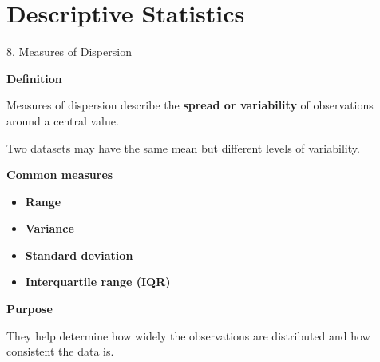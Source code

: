 
\section{Descriptive Statistics}


\begin{frame}{8. Measures of Dispersion}

\textbf{Definition}

Measures of dispersion describe the \textbf{spread or variability}
of observations around a central value.

\vspace{0.4cm}

Two datasets may have the same mean but different levels of
variability.

\vspace{0.4cm}

\textbf{Common measures}

\begin{itemize}
    \item \textbf{Range}
    \item \textbf{Variance}
    \item \textbf{Standard deviation}
    \item \textbf{Interquartile range (IQR)}
\end{itemize}

\vspace{0.3cm}

\textbf{Purpose}

They help determine how widely the observations are distributed
and how consistent the data is.

\end{frame}



